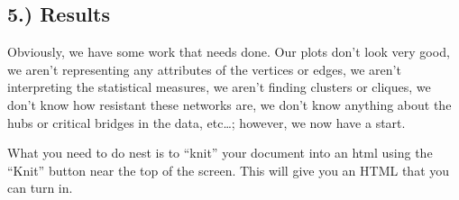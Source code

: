 \documentclass[
]{article}
\begin{document}
\subsection{}\label{section}

\subsection{5.) Results}\label{results}

Obviously, we have some work that needs done. Our plots don't look very
good, we aren't representing any attributes of the vertices or edges, we
aren't interpreting the statistical measures, we aren't finding clusters
or cliques, we don't know how resistant these networks are, we don't
know anything about the hubs or critical bridges in the data, etc\ldots;
however, we now have a start.

What you need to do nest is to ``knit'' your document into an html using
the ``Knit'' button near the top of the screen. This will give you an
HTML that you can turn in.
\end{document}
